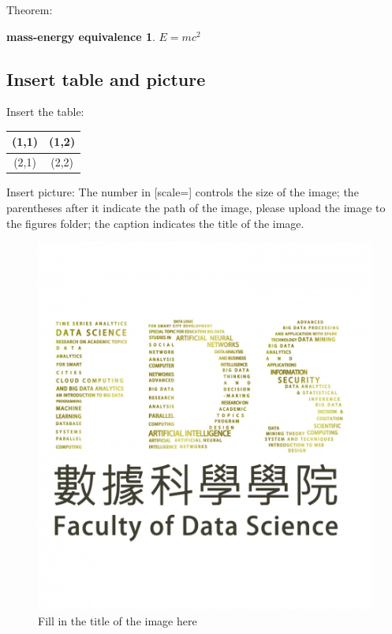 \documentclass[12pt,hyperref,a4paper,UTF8]{article}
\begin{document}
Theorem:
\newtheorem{mass-energy equivalence}{mass-energy equivalence}[section]
\begin{mass-energy equivalence} \label{thm:1}
$E = mc^2$
\end{mass-energy equivalence}

\subsection{Insert table and picture}
Insert the table:
\begin{table}[h]
    \begin{tabular}{|c|c|}%
        \hline  %
        (1,1) & (1,2) \\
        \hline  %
        (2,1) & (2,2) \\
        \hline %
    \end{tabular}
\end{table}

Insert picture:
The number in [scale=] controls the size of the image; the parentheses after it indicate the path of the image, please upload the image to the figures folder; the caption indicates the title of the image.
\begin{figure}[h]
    \centering
    \includegraphics[scale=0.1]{figures/FDS logo.jpg}
    \caption{Fill in the title of the image here}
\end{figure}
\end{document}
